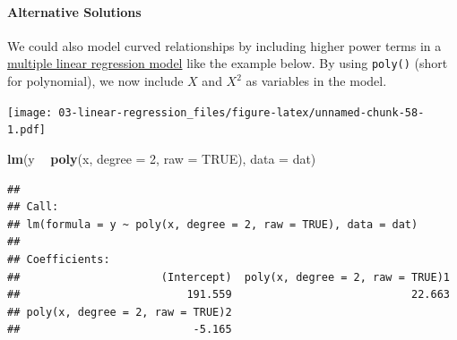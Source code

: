 \documentclass[
]{book}
\newenvironment{Shaded}{\begin{snugshade}}{\end{snugshade}}
\newcommand{\DataTypeTok}[1]{\textcolor[rgb]{0.13,0.29,0.53}{#1}}
\newcommand{\DecValTok}[1]{\textcolor[rgb]{0.00,0.00,0.81}{#1}}
\newcommand{\KeywordTok}[1]{\textcolor[rgb]{0.13,0.29,0.53}{\textbf{#1}}}
\newcommand{\NormalTok}[1]{#1}
\newcommand{\OperatorTok}[1]{\textcolor[rgb]{0.81,0.36,0.00}{\textbf{#1}}}
\newcommand{\OtherTok}[1]{\textcolor[rgb]{0.56,0.35,0.01}{#1}}
\newcommand{\StringTok}[1]{\textcolor[rgb]{0.31,0.60,0.02}{#1}}
\begin{document}
\hypertarget{alternative-solutions}{%
\paragraph{Alternative Solutions}\label{alternative-solutions}}

We could also model curved relationships by including higher power terms in a \protect\hyperlink{multiple}{multiple linear regression model} like the example below. By using \texttt{poly()} (short for polynomial), we now include \(X\) and \(X^2\) as variables in the model.

\begin{Shaded}
\end{Shaded}

\texttt{[image: 03-linear-regression\_files/figure-latex/unnamed-chunk-58-1.pdf]}

\begin{Shaded}
\begin{Highlighting}[]
\KeywordTok{lm}\NormalTok{(y }\OperatorTok{~}\StringTok{ }\KeywordTok{poly}\NormalTok{(x, }\DataTypeTok{degree =} \DecValTok{2}\NormalTok{, }\DataTypeTok{raw =} \OtherTok{TRUE}\NormalTok{), }\DataTypeTok{data =}\NormalTok{ dat)}
\end{Highlighting}
\end{Shaded}

\begin{verbatim}
## 
## Call:
## lm(formula = y ~ poly(x, degree = 2, raw = TRUE), data = dat)
## 
## Coefficients:
##                      (Intercept)  poly(x, degree = 2, raw = TRUE)1  
##                          191.559                            22.663  
## poly(x, degree = 2, raw = TRUE)2  
##                           -5.165
\end{verbatim}
\end{document}
